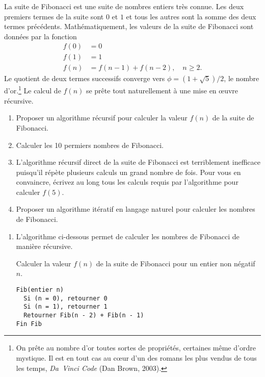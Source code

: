 \begin{exercice}
  La suite de Fibonacci est une suite de
  nombres entiers très connue. Les deux premiers termes de la suite
  sont $0$ et $1$ et tous les autres sont la somme des deux termes
  précédents. Mathématiquement, les valeurs de la suite de Fibonacci
  sont données par la fonction
  \begin{align*}
    f(0) &= 0 \\
    f(1) &= 1 \\
    f(n) & = f(n - 1) + f(n - 2), \quad n \geq 2.
  \end{align*}
  Le quotient de deux termes successifs converge vers
  $\phi = (1 + \sqrt{5})/2$, le nombre d'or.\footnote{%
    On prête au nombre d'or toutes sortes de propriétés, certaines
    même d'ordre mystique. Il est en tout cas au cœur d'un des romans
    les plus vendus de tous les temps, \emph{Da~Vinci Code} (Dan
    Brown, 2003).} %
  Le calcul de $f(n)$ se prête tout naturellement à une mise en œuvre
  récursive.
  \begin{enumerate}
  \item Proposer un algorithme récursif pour calculer la valeur $f(n)$
    de la suite de Fibonacci.
  \item Calculer les 10 permiers nombres de Fibonacci.
  \item L'algorithme récursif direct de la suite de Fibonacci est
    terriblement inefficace puisqu'il répète plusieurs calculs un
    grand nombre de fois. Pour vous en convaincre, écrivez au long
    tous les calculs requis par l'algorithme pour calculer $f(5)$.
  \item Proposer un algorithme itératif en langage naturel pour
    calculer les nombres de Fibonacci.
  \end{enumerate}
  \begin{sol}
    \begin{enumerate}
    \item L'algorithme ci-dessous permet de calculer les nombres de
      Fibonacci de manière récursive.
      \begin{algorithme}
        \label{algo:algorithmes:Fibonacci}
        Calculer la valeur $f(n)$ de la suite de
        Fibonacci pour un entier non négatif $n$.
        \begin{Schunk}
\begin{Verbatim}
Fib(entier n)
  Si (n = 0), retourner 0
  Si (n = 1), retourner 1
  Retourner Fib(n - 2) + Fib(n - 1)
Fin Fib
\end{Verbatim}

\end{Schunk}
\end{algorithme}
\end{enumerate}
\end{sol}
\end{exercice}
